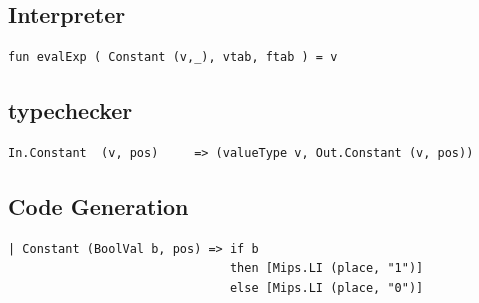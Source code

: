 \documentclass[11pt]{article}
\begin{document}
    \subsection{Interpreter}
    \begin{lstlisting}[basicstyle=\small]
fun evalExp ( Constant (v,_), vtab, ftab ) = v
    \end{lstlisting}

    \subsection{typechecker}
    \begin{lstlisting}[basicstyle=\small]
In.Constant  (v, pos)     => (valueType v, Out.Constant (v, pos))
    \end{lstlisting}

    \subsection{Code Generation}
    \begin{lstlisting}[basicstyle=\small]
| Constant (BoolVal b, pos) => if b
                               then [Mips.LI (place, "1")]
                               else [Mips.LI (place, "0")]
    \end{lstlisting}
\end{document}
